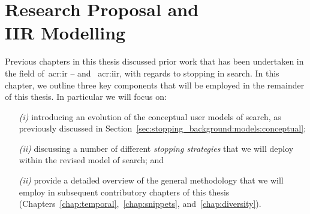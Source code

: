 
\chapter[Models and Proposal]{Research Proposal and\\IIR Modelling}\label{chap:proposal}


%
%
%
%
%
%
%
%
%
%
%
%
%

Previous chapters in this thesis discussed prior work that has been undertaken in the field of~\gls{acr:ir} -- and ~\gls{acr:iir}, with regards to stopping in search. In this chapter, we outline three key components that will be employed in the remainder of this thesis. In particular we will focus on:

\begin{itemize}
    \item[\emph{(i)}]{introducing an evolution of the conceptual user models of search, as previously discussed in Section~\ref{sec:stopping_background:models:conceptual};}
    \item[\emph{(ii)}]{discussing a number of different \emph{stopping strategies} that we will deploy within the revised model of search; and}
    \item[\emph{(ii)}]{provide a detailed overview of the general methodology that we will employ in subsequent contributory chapters of this thesis (Chapters~\ref{chap:temporal},~\ref{chap:snippets}, and~\ref{chap:diversity}).}
\end{itemize}

